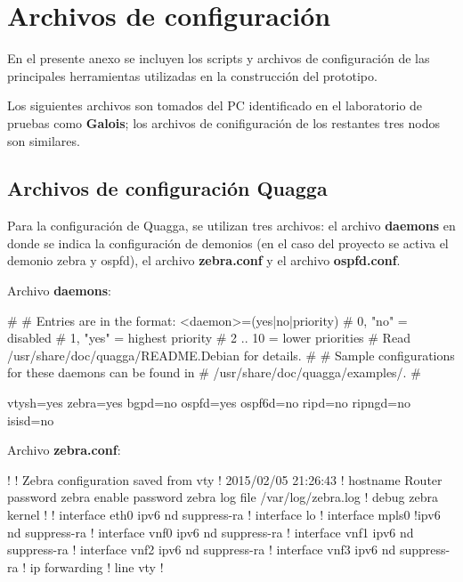 
\chapter{Archivos de configuración}
\label{appendix4}

En el presente anexo se incluyen los scripts y archivos de configuraci\'on de las principales herramientas utilizadas en la construcción del prototipo.

Los siguientes archivos son tomados del PC identificado en el laboratorio de pruebas como \textbf{Galois}; los archivos de conifiguraci\'on de los restantes tres nodos son similares.

\section{Archivos de configuraci\'on Quagga}
Para la configuración de Quagga, se utilizan tres archivos: el archivo \textbf{daemons} en donde se indica la configuraci\'on de demonios (en el caso del proyecto se activa el demonio zebra y ospfd), el archivo \textbf{zebra.conf} y el archivo \textbf{ospfd.conf}.

\vspace{1cm}
Archivo \textbf{daemons}:
\begin{bash}
#
# Entries are in the format: <daemon>=(yes|no|priority)
#   0, "no"  = disabled
#   1, "yes" = highest priority
#   2 .. 10  = lower priorities
# Read /usr/share/doc/quagga/README.Debian for details.
#
# Sample configurations for these daemons can be found in
# /usr/share/doc/quagga/examples/.
#

vtysh=yes
zebra=yes
bgpd=no
ospfd=yes
ospf6d=no
ripd=no
ripngd=no
isisd=no

\end{bash}

\newpage

Archivo \textbf{zebra.conf}:
\begin{bash}
!
! Zebra configuration saved from vty
!   2015/02/05 21:26:43
!
hostname Router
password zebra
enable password zebra
log file /var/log/zebra.log
!
debug zebra kernel
!
!
interface eth0
 ipv6 nd suppress-ra
!
interface lo
!
interface mpls0
 !ipv6 nd suppress-ra
!
interface vnf0
 ipv6 nd suppress-ra
!
interface vnf1
 ipv6 nd suppress-ra
!
interface vnf2
 ipv6 nd suppress-ra
!
interface vnf3
 ipv6 nd suppress-ra
!
ip forwarding
!
line vty
!
\end{bash}

